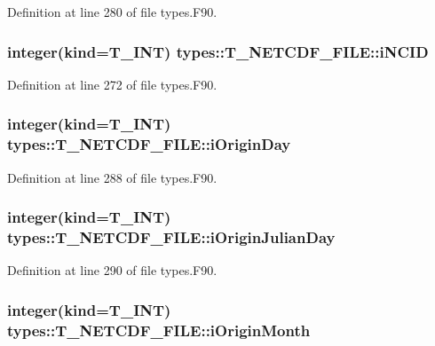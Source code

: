 Definition at line 280 of file types.F90.

\hypertarget{typetypes_1_1_t___n_e_t_c_d_f___f_i_l_e_a3dc19c7046eddccb8cd44827d3a0033c}{
\subsubsection[{iNCID}]{\setlength{\rightskip}{0pt plus 5cm}integer(kind={\bf T\_\-INT}) {\bf types::T\_\-NETCDF\_\-FILE::iNCID}}}
\label{typetypes_1_1_t___n_e_t_c_d_f___f_i_l_e_a3dc19c7046eddccb8cd44827d3a0033c}


Definition at line 272 of file types.F90.

\hypertarget{typetypes_1_1_t___n_e_t_c_d_f___f_i_l_e_aeb3a7dc9cd69edec7f2e38f85c386096}{
\subsubsection[{iOriginDay}]{\setlength{\rightskip}{0pt plus 5cm}integer(kind={\bf T\_\-INT}) {\bf types::T\_\-NETCDF\_\-FILE::iOriginDay}}}
\label{typetypes_1_1_t___n_e_t_c_d_f___f_i_l_e_aeb3a7dc9cd69edec7f2e38f85c386096}


Definition at line 288 of file types.F90.

\hypertarget{typetypes_1_1_t___n_e_t_c_d_f___f_i_l_e_a88e0da4fa0d6db64621cdc123e4609b3}{
\subsubsection[{iOriginJulianDay}]{\setlength{\rightskip}{0pt plus 5cm}integer(kind={\bf T\_\-INT}) {\bf types::T\_\-NETCDF\_\-FILE::iOriginJulianDay}}}
\label{typetypes_1_1_t___n_e_t_c_d_f___f_i_l_e_a88e0da4fa0d6db64621cdc123e4609b3}


Definition at line 290 of file types.F90.

\hypertarget{typetypes_1_1_t___n_e_t_c_d_f___f_i_l_e_a9f4f87c36a8842dbc1c09b6041f2fed8}{
\subsubsection[{iOriginMonth}]{\setlength{\rightskip}{0pt plus 5cm}integer(kind={\bf T\_\-INT}) {\bf types::T\_\-NETCDF\_\-FILE::iOriginMonth}}}
\label{typetypes_1_1_t___n_e_t_c_d_f___f_i_l_e_a9f4f87c36a8842dbc1c09b6041f2fed8}


